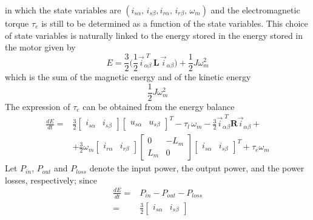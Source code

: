 \documentclass[12pt,a4paper,oneside]{book}
\begin{document}
\begin{onehalfspace}
in which the state variables are $(i_{s\alpha},\,i_{s\beta}, 
i_{r\alpha},\,i_{r\beta},\,\omega_m)$ and the electromagnetic torque $\tau_e$ 
is still to be determined as a function of the state variables. This choice of 
state variables is naturally linked to the energy stored in the energy stored 
in the motor given by
\begin{equation}\label{im_eq_25}
	E = \frac{3}{2}\Bigg(\frac{1}{2} \vec{i}_{\alpha\beta}^{\,\,T} 
	\,\mathbf{L}\, \vec{i}_{\alpha\beta} \Bigg)+\frac{1}{2}J\omega_m^2
\end{equation}
which is the sum of the magnetic energy and of the kinetic energy
\begin{equation}\label{im_eq_26}
	\frac{1}{2}J\omega_m^2
\end{equation}
The expression of $\tau_e$ can be obtained from the energy balance
\begin{equation}\label{im_eq_27}
	\begin{aligned}
		\frac{dE}{dt} = &
		\frac{3}{2}\left[\begin{matrix}
			i_{s\alpha} & i_{s\beta}
		\end{matrix}\right]
		\left[\begin{matrix}
			u_{s\alpha} & u_{s\beta}
		\end{matrix}\right]^T 
		-\tau_l\,\omega_m-\frac{3}{2}\vec{i}_{\alpha\beta}^{\,\,T}\mathbf{R}\vec{i}_{\alpha\beta}
		+ \\[6pt]
		& + \frac{3}{2}\omega_m
		\left[\begin{matrix}
			i_{r\alpha} & i_{r\beta}
		\end{matrix}\right]
		\left[\begin{matrix}
			0 & -L_m \\
			L_m & 0
		\end{matrix}\right]
		\left[\begin{matrix}
			i_{s\alpha} & i_{s\beta}
		\end{matrix}\right]^T
		+\tau_e\omega_m
	\end{aligned}
\end{equation}
Let $P_{in}$, $P_{out}$ and $P_{loss}$ denote the input power, the output 
power, and the power losses, respectively; since
\begin{equation}\label{im_eq_28}
	\begin{aligned}
		\frac{dE}{dt} = & P_{in} - P_{out} -P_{loss} \\[6pt]
		= &
		\frac{3}{2}\left[\begin{matrix}
			i_{s\alpha} & i_{s\beta}
		\end{matrix}\right]

\end{aligned}
\end{equation}
\end{onehalfspace}
\end{document}
